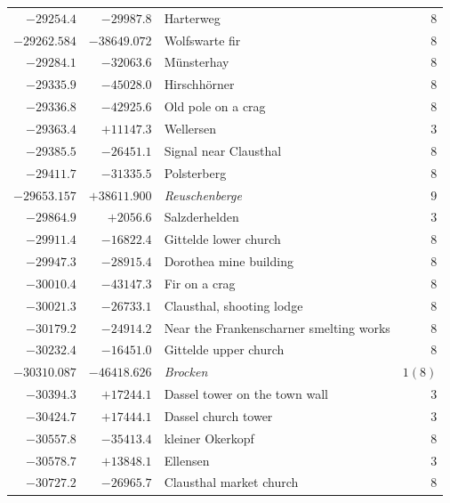 \begin{center}
\begin{tabular}{r|r|p{170pt}|r}
\(-29254.4\)&\(-29987.8\)&Harterweg&\(8\)\\
\(-29262.584\)&\(-38649.072\)&Wolfswarte fir&\(8\)\\
\(-29284.1\)&\(-32063.6\)&Münsterhay&\(8\)\\
\(-29335.9\)&\(-45028.0\)&Hirschhörner&\(8\)\\
\(-29336.8\)&\(-42925.6\)&Old pole on a crag&\(8\)\\
\(-29363.4\)&\(+11147.3\)&Wellersen&\(3\)\\
\(-29385.5\)&\(-26451.1\)&Signal near Clausthal&\(8\)\\
\(-29411.7\)&\(-31335.5\)&Polsterberg&\(8\)\\
\(-29653.157\)&\(+38611.900\)&\textit{Reuschenberge}&\(9\)\\
\(-29864.9\)&\(+2056.6\)&Salzderhelden&\(3\)\\
\(-29911.4\)&\(-16822.4\)&Gittelde lower church&\(8\)\\
\(-29947.3\)&\(-28915.4\)&Dorothea mine building&\(8\)\\
\(-30010.4\)&\(-43147.3\)&Fir on a crag&\(8\)\\
\(-30021.3\)&\(-26733.1\)&Clausthal, shooting lodge&\(8\)\\
\(-30179.2\)&\(-24914.2\)&Near the Frankenscharner smelting works&\(8\)\\
\(-30232.4\)&\(-16451.0\)&Gittelde upper church&\(8\)\\
\(-30310.087\)&\(-46418.626\)&\textit{Brocken}&\(1 (8)\)\\
\(-30394.3\)&\(+17244.1\)&Dassel tower on the town wall&\(3\)\\
\(-30424.7\)&\(+17444.1\)&Dassel church tower&\(3\)\\
\(-30557.8\)&\(-35413.4\)&kleiner Okerkopf&\(8\)\\
\(-30578.7\)&\(+13848.1\)&Ellensen&\(3\)\\
\(-30727.2\)&\(-26965.7\)&Clausthal market church&\(8\)\\
\hline\end{tabular}\endgroup\end{center}
\clearpage
